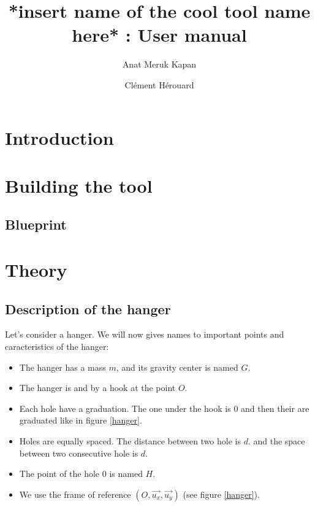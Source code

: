 \documentclass{report}
\title{*insert name of the cool tool name here* : User manual}
\author{Anat Meruk Kapan \and Clément Hérouard}
\begin{document}
\maketitle

\begin{abstract}

\end{abstract}

\tableofcontents

\chapter{Introduction}

\chapter{Building the tool}

\section{Blueprint}

\chapter{Theory}

\section{Description of the hanger}

Let's consider a hanger.
We will now gives names to important points and caracteristics of the hanger:
\begin{itemize}
\item The hanger has a mass $m$, and its gravity center is named $G$.
\item The hanger is and by a hook at the point $O$.
\item Each hole have a graduation. The one under the hook is $0$ and then their are graduated like in figure \ref{hanger}. 
\item Holes are equally spaced. The distance between two hole is $d$.
and the space between two consecutive hole is $d$.
\item The point of the hole $0$ is named $H$.
\item We use the frame of reference $(O,\overrightarrow{u_x},\overrightarrow{u_y})$ (see figure \ref{hanger}).
\end{itemize}
\end{document}
